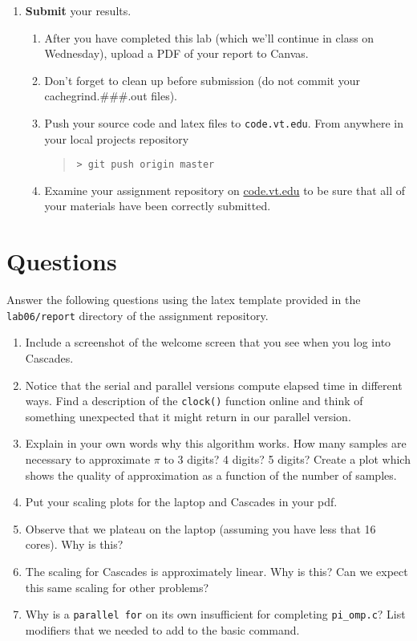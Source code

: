 \documentclass[letter]{article}
\begin{document}
\begin{enumerate}
    \item \textbf{Submit} your results.
        \begin{enumerate}
            \item After you have completed this lab (which we'll continue in class on Wednesday), upload a PDF of your report to Canvas.
            \item Don't forget to clean up before submission (do not commit your cachegrind.###.out files).
            \item Push your source code and latex files to \texttt{code.vt.edu}.  From anywhere in your local projects repository
                \begin{quote}
                    \texttt{> git push origin master}
                \end{quote}
            \item Examine your assignment repository on \url{code.vt.edu} to be sure that all of your materials have been correctly submitted.
        \end{enumerate}
   
\end{enumerate}

\pagebreak
\section*{Questions}

    Answer the following questions using the latex template provided in the \texttt{lab06/report} directory of the assignment repository.

    \begin{enumerate}
        \item Include a screenshot of the welcome screen that you see when you log into Cascades. 
        \item Notice that the serial and parallel versions compute elapsed time in different ways.  Find a description of the \texttt{clock()} function online and think of something unexpected that it might return in our parallel version.
        \item Explain in your own words why this algorithm works.  How many samples are necessary to approximate $\pi$ to 3 digits? 4 digits? 5 digits?  Create a plot which shows the quality of approximation as a function of the number of samples.
        \item Put your scaling plots for the laptop and Cascades in your pdf. 
        \item Observe that we plateau on the laptop (assuming you have less that 16 cores). Why is this?
        
        \item The scaling for Cascades is approximately linear. Why is this? Can we expect this same scaling for other problems?
        
        \item Why is a \texttt{parallel for} on its own insufficient for completing \texttt{pi\_omp.c}?  List modifiers that we needed to add to the basic command.
        
    \end{enumerate}
\end{document}
